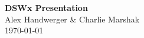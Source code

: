 \documentclass[8pt]{beamer}
\begin{document}
\begin{frame}
\begin{center}
\textbf{DSWx Presentation}\\
\vspace{.5cm}
Alex Handwerger \& Charlie Marshak \\

\today\\
\end{center}
\end{frame}



\end{document}
